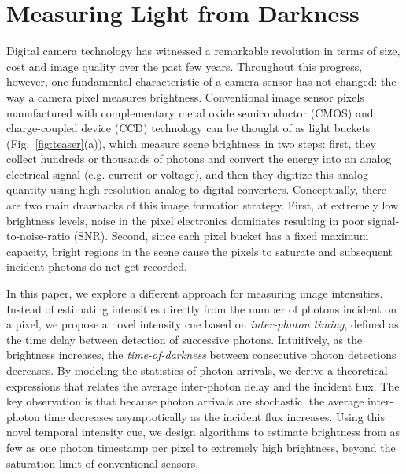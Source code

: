 \section{Measuring Light from Darkness}
Digital camera technology has witnessed a remarkable revolution in terms
of size, cost and image quality over the past few years. Throughout this
progress, however, one fundamental characteristic of a camera sensor
has not changed: the way a camera pixel measures brightness.
Conventional image sensor pixels manufactured with complementary metal oxide
semiconductor (CMOS) and charge-coupled device (CCD) technology can be thought
of as light buckets (Fig.~\ref{fig:teaser}(a)), which measure scene brightness
in two steps: first, they collect hundreds or thousands of photons and convert
the energy into an analog electrical signal (e.g.  current or voltage), and
then they digitize this analog quantity using high-resolution analog-to-digital
converters. Conceptually, there are two main drawbacks of this image formation
strategy. First, at extremely low brightness levels, noise in the pixel
electronics dominates resulting in poor signal-to-noise-ratio (SNR). Second,
since each pixel bucket has a fixed maximum capacity, bright regions in the
scene cause the pixels to saturate and subsequent incident photons do not get
recorded.  

In this paper, we explore a different approach for measuring image intensities.
Instead of estimating intensities directly from the number of photons incident
on a pixel, we propose a novel intensity cue based on \emph{inter-photon
timing}, defined as the time delay between detection of successive photons.
Intuitively, as the brightness increases, the \emph{time-of-darkness} between
consecutive photon detections decreases.  By modeling the statistics of photon
arrivals, we derive a theoretical expressions that relates the average
inter-photon delay and the incident flux. The key observation is that because
photon arrivals are stochastic, the average inter-photon time
decreases asymptotically as the incident flux increases.
Using this novel temporal intensity cue, we design algorithms to estimate
brightness from as few as one photon timestamp per pixel to extremely high
brightness, beyond the saturation limit of conventional sensors.

